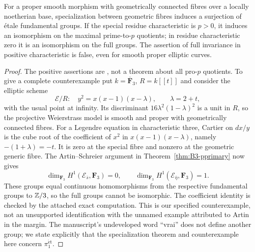 \begin{theorem}\label{thm:B3-specialization}
For a proper smooth morphism with geometrically connected fibres over
a locally noetherian base, specialization between geometric fibres
induces a surjection of \'etale fundamental groups. If the special
residue characteristic is $p>0$, it induces an isomorphism on the
maximal prime-to-$p$ quotients; in residue characteristic zero it is
an isomorphism on the full groups.
The assertion of full invariance in positive characteristic is false,
even for smooth proper elliptic curves.
\end{theorem}
\begin{proof}
The positive assertions are \cite[Expos\'e X, Theorem 3.8 and
Corollary 3.9, original p.~283]{BSGA1}, not a theorem about all
pro-$p$ quotients. To give a complete counterexample put
$k=\overline{\mathbf F}_3$, $R=k[[t]]$ and consider the elliptic scheme
\[
 \mathcal E/R:\quad y^2=x(x-1)(x-\lambda),\qquad\lambda=2+t,
\]
with the usual point at infinity. Its discriminant
$16\lambda^2(1-\lambda)^2$ is a unit in $R$, so the projective
Weierstrass model is smooth and proper with geometrically connected
fibres. For a Legendre equation in characteristic three, Cartier on
$dx/y$ is the cube root of the coefficient of $x^2$ in
$x(x-1)(x-\lambda)$, namely $-(1+\lambda)=-t$.
It is zero at the special fibre and nonzero at the geometric generic
fibre. The Artin--Schreier argument in
Theorem~\ref{thm:B3-pprimary} now gives
\[
 \dim_{\mathbf F_3}H^1(\mathcal E_{\bar s},\mathbf F_3)=0,
 \qquad
 \dim_{\mathbf F_3}H^1(\mathcal E_{\bar\eta},\mathbf F_3)=1.
\]
These groups equal continuous homomorphisms from the respective
fundamental groups to ${\mathbb{Z}}/3$, so the full groups cannot be isomorphic.
The coefficient identity is checked by the attached exact computation.
This is our specified counterexample, not an unsupported identification
with the unnamed example attributed to Artin in the margin. The
manuscript's undeveloped word ``vrai'' does not define another group;
we state explicitly that the specialization theorem and counterexample
here concern $\pi_1^{\mathrm{\acute et}}$.
\end{proof}

